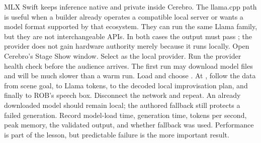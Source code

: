 {}MLX Swift keeps inference native and private inside Cerebro. The llama.cpp\markdownRendererSoftLineBreak
{}path is useful when a builder already operates a compatible local server or\markdownRendererSoftLineBreak
{}wants a model format supported by that ecosystem. They can run the same Llama\markdownRendererSoftLineBreak
{}family, but they are not interchangeable APIs. In both cases the output must\markdownRendererSoftLineBreak
{}pass ; the provider does not gain hardware\markdownRendererSoftLineBreak
{}authority merely because it runs locally.\markdownRendererInterblockSeparator
{}
\markdownRendererSectionEnd \markdownRendererSectionBegin
{}\markdownRendererInterblockSeparator
{}\markdownRendererOlBegin
{}Open Cerebro's Stage Show window.\markdownRendererOlItemEnd 
{}Select  as the local provider.\markdownRendererOlItemEnd 
{}Run the provider health check before the audience arrives. The first run\markdownRendererSoftLineBreak
{}may download model files and will be much slower than a warm run.\markdownRendererOlItemEnd 
{}Load  and choose .\markdownRendererOlItemEnd 
{}At , follow the data from scene goal, to Llama tokens, to the\markdownRendererSoftLineBreak
{}decoded local improvisation plan, and finally to ROB's speech box.\markdownRendererOlItemEnd 
{}Disconnect the network and repeat. An already downloaded model should\markdownRendererSoftLineBreak
{}remain local; the authored fallback still protects a failed generation.\markdownRendererOlItemEnd 
\markdownRendererOlEnd \markdownRendererInterblockSeparator
{}Record model-load time, generation time, tokens per second, peak memory, the\markdownRendererSoftLineBreak
{}validated output, and whether fallback was used. Performance is part of the\markdownRendererSoftLineBreak
{}lesson, but predictable failure is the more important result.\markdownRendererInterblockSeparator
{}\markdownRendererThematicBreak{}\markdownRendererInterblockSeparator
{}
\markdownRendererSectionEnd 
\markdownRendererSectionEnd \markdownRendererSectionBegin
{}\markdownRendererInterblockSeparator
